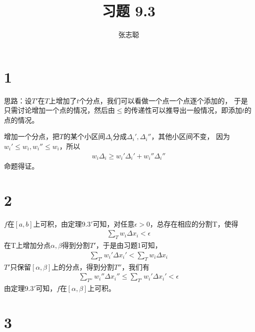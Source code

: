 \documentclass{article}
\begin{document}
\title{习题 9.3}
\author{张志聪}
\maketitle

\section*{1}

思路：设$T'$在$T$上增加了$t$个分点，我们可以看做一个点一个点逐个添加的，
于是只需讨论增加一个点的情况，然后由$\leq$的传递性可以推导出一般情况，即添加$t$的点的情况。

增加一个分点，把$T$的某个小区间$\Delta_i$分成$\Delta_i', \Delta_i''$，其他小区间不变，
因为$w_i' \leq w_i, w_i'' \leq w_i$，所以
\begin{align*}
  w_i \Delta_i \geq w_i' \Delta_i' + w_i'' \Delta_i''
\end{align*}
命题得证。

\section*{2}

$f$在$[a, b]$上可积，由定理$9.3'$可知，对任意$\epsilon > 0$，总存在相应的分割T，使得
\begin{align*}
  \sum\limits_{T} w_i \Delta x_i < \epsilon
\end{align*}
在T上增加分点$\alpha, \beta$得到分割$T'$，于是由习题1可知，
\begin{align*}
  \sum\limits_{T'} w_i' \Delta x_i' < \sum\limits_{T} w_i \Delta x_i
\end{align*}
$T'$只保留$[\alpha, \beta]$上的分点，得到分割$T''$，我们有
\begin{align*}
  \sum\limits_{T''} w_i'' \Delta x_i'' \leq \sum\limits_{T'} w_i' \Delta x_i' < \epsilon
\end{align*}
由定理$9.3'$可知，$f$在$[\alpha, \beta]$上可积。

\section*{3}
\end{document}
